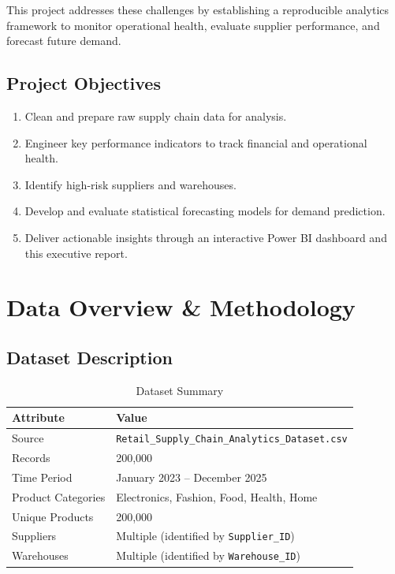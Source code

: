 \documentclass[11pt,a4paper]{article}
\begin{document}
This project addresses these challenges by establishing a reproducible analytics framework to monitor operational health, evaluate supplier performance, and forecast future demand.

\subsection{Project Objectives}

\begin{enumerate}[leftmargin=1.5em]
    \item Clean and prepare raw supply chain data for analysis.
    \item Engineer key performance indicators to track financial and operational health.
    \item Identify high-risk suppliers and warehouses.
    \item Develop and evaluate statistical forecasting models for demand prediction.
    \item Deliver actionable insights through an interactive Power BI dashboard and this executive report.
\end{enumerate}

\section{Data Overview \& Methodology}

\subsection{Dataset Description}

\begin{table}[H]
\centering
\caption{Dataset Summary}
\label{tab:dataset}
\begin{tabular}{@{}ll@{}}
\toprule
\textbf{Attribute} & \textbf{Value} \\
\midrule
Source & \texttt{Retail\_Supply\_Chain\_Analytics\_Dataset.csv} \\
Records & 200,000 \\
Time Period & January 2023 -- December 2025 \\
Product Categories & Electronics, Fashion, Food, Health, Home \\
Unique Products & 200,000 \\
Suppliers & Multiple (identified by \texttt{Supplier\_ID}) \\
Warehouses & Multiple (identified by \texttt{Warehouse\_ID}) \\
\bottomrule
\end{tabular}
\end{table}
\end{document}
